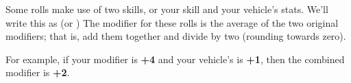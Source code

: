 
Some rolls make use of two skills, or your skill and your vehicle's stats. We'll write this as  (or ) The modifier for these rolls is the average of the two original modifiers; that is, add them together and divide by two (rounding towards zero).

For example, if your  modifier is \textbf{+4} and your vehicle's  is \textbf{+1}, then the combined modifier  is \textbf{+2}.
